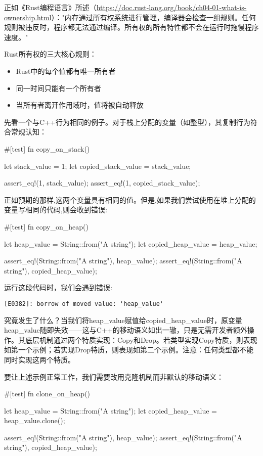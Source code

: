 正如《Rust编程语言》所述（\url{https://doc.rust-lang.org/book/ch04-01-what-is-ownership.html}）："内存通过所有权系统进行管理，编译器会检查一组规则。任何规则被违反时，程序都无法通过编译。所有权的所有特性都不会在运行时拖慢程序速度。"

Rust所有权的三大核心规则：

\begin{itemize}
\item 
Rust中的每个值都有唯一所有者

\item 
同一时间只能有一个所有者

\item 
当所有者离开作用域时，值将被自动释放
\end{itemize}

先看一个与C++行为相同的例子。对于栈上分配的变量（如整型），其复制行为符合常规认知：

\begin{rust}
#[test]
fn copy_on_stack() {
  let stack_value = 1;
  let copied_stack_value = stack_value;

  assert_eq!(1, stack_value);
  assert_eq!(1, copied_stack_value);
}
\end{rust}

正如预期的那样,这两个变量具有相同的值。但是,如果我们尝试使用在堆上分配的变量写相同的代码,则会收到错误:

\begin{rust}
#[test]
fn copy_on_heap() {
  let heap_value = String::from("A string");
  let copied_heap_value = heap_value;

  assert_eq!(String::from("A string"), heap_value);
  assert_eq!(String::from("A string"), copied_heap_value);
}
\end{rust}

运行这段代码时，我们会遇到错误:

\verb|[E0382]: borrow of moved value: 'heap_value'|

究竟发生了什么？当我们将heap\_value赋值给copied\_heap\_value时，原变量heap\_value随即失效——这与C++的移动语义如出一辙，只是无需开发者额外操作。其底层机制通过两个特质实现：Copy和Drop。若类型实现Copy特质，则表现如第一个示例；若实现Drop特质，则表现如第二个示例。注意：任何类型都不能同时实现这两个特质。

要让上述示例正常工作，我们需要改用克隆机制而非默认的移动语义：

\begin{rust}
#[test]
fn clone_on_heap() {
  let heap_value = String::from("A string");
  let copied_heap_value = heap_value.clone();

  assert_eq!(String::from("A string"), heap_value);
  assert_eq!(String::from("A string"), copied_heap_value);
}
\end{rust}

